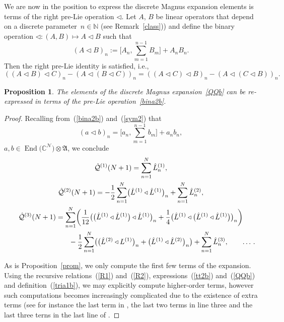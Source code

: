 \documentclass[pdftex]{sigma}
\numberwithin{equation}{section}
\newtheorem{pro}[thm]{Proposition}
\theoremstyle{definition}
\DeclareMathOperator{\EEnd}{End}%
\begin{document}
We are now in the position to express the discrete Magnus
expansion elements is terms of the right pre-Lie operation $\triangleleft$.
Let $A$, $B$ be linear operators that depend on a discrete parameter~${n\in {\mathbb N}}$ (see Remark~\ref{class}))
and define the binary operation
$ \triangleleft\colon (A, B) \mapsto A \triangleleft B$ such that
\begin{equation}
(A\triangleleft B)_n := \Biggl[A_n, \sum_{m=1}^{n-1} B_m \Biggr] +A_n B_n. \label{bina2b}
\end{equation}
Then the right pre-Lie identity is satisfied, i.e.,
\begin{equation}
( (A \triangleleft B) \triangleleft C)_n- ( A \triangleleft (B \triangleleft C))_n =( (A \triangleleft C) \triangleleft B)_n- (A \triangleleft(C \triangleleft B))_n. \label{sym2}
\end{equation}

\begin{pro}
The elements of the discrete Magnus expansion~\eqref{QQb} can be re-expressed in terms of the pre-Lie operation~\eqref{bina2b}.
\end{pro}
\begin{proof}
Recalling from~(\ref{bina2b}) and~(\ref{sym2}) that
\begin{equation}
(a \triangleleft b)_n = \Biggl[a_n, \sum_{m=1}^{n-1}b_m\Biggr] + a_n b_n, \label{tria1b}
\end{equation}
$a,b \in \EEnd\bigl({\mathbb C}^{\mathcal N}\bigr) \otimes {\mathfrak A}$, we conclude
\begin{gather*}
 \hat {\mathcal Q}^{(1)}(N+1) = \sum_{n=1}^N\hat L^{(1)}_n, \cr
 \hat {\mathcal Q}^{(2)}(N+1) =-\frac{1}{2} \sum_{n=1}^N
 \bigl(\hat L^{(1)} \triangleleft \hat L^{(1)}\bigr)_n +\sum_{n=1}^N\hat L_n^{(2)},\nonumber\\
 \hat {\mathcal Q}^{(3)}(N+1)= \sum_{n=1}^N\biggl(
\frac{1}{12} \bigl(\bigl(\hat L^{(1)} \triangleleft \hat L^{(1)}\bigr) \triangleleft \hat L^{(1)}\bigr)_n +\frac{1}{4}
\bigl(\hat L^{(1)} \triangleleft \bigl(\hat L^{(1)} \triangleleft \hat L^{(1)}\bigr)\bigr)_n \biggr)\cr
\hphantom{\hat {\mathcal Q}^{(3)}(N+1)= \sum_{n=1}^N\biggl(}{}
 -\frac{1}{2} \sum_{n=1}^N\bigl(\bigl(\hat L^{(2)} \triangleleft L^{(1)}\bigr)_n+ \bigl(\hat L^{(1)}\triangleleft \hat L^{(2)}\bigr)_n\bigr)
+ \sum_{n=1}^N \hat L_n^{(3)}, \qquad \dots\,. \nonumber
\end{gather*}

As is Proposition~\ref{prom}, we only compute the first few terms of the expansion. Using the recursive relations~(\ref{R1}) and~(\ref{R2}), expressions~(\ref{tt2b}) and~(\ref{QQb}) and definition~(\ref{tria1b}), we may explicitly compute higher-order terms, however such computations becomes increasingly complicated due to the existence of extra terms (see for instance the last term in , the last two terms in line three  and the last three terns in the last line of .
\end{proof}
\end{document}
